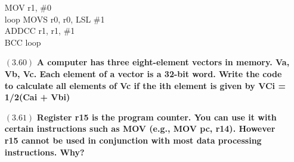 \documentclass[letterpaper,10pt,titlepage]{article}
\begin{document}
\begin{enumerate}
MOV r1, \#0\\
loop MOVS r0, r0, LSL \#1\\
ADDCC r1, r1, \#1\\
BCC loop	

\item[$(3.60)$] \textbf{A computer has three eight-element vectors in memory. Va, Vb, Vc.
Each element of a vector is a 32-bit word. Write the code to calculate all elements of Vc if the ith element is given by VCi = 1/2(Cai + Vbi)}

\item[$(3.61)$] \textbf{Register r15 is the program counter. You can use it with certain instructions such as MOV (e.g., MOV pc, r14). However r15 cannot be used in conjunction with most data processing instructions. Why?}
\end{enumerate}
\end{document}
